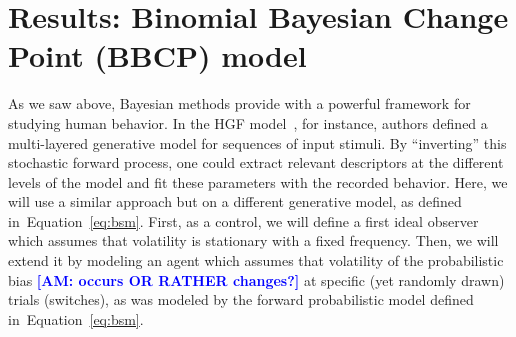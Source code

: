 \documentclass[12pt,english]{article}%
\newcommand{\citep}[1]{\parencite{#1}}
\newcommand{\seeEq}[1]{Equation~\ref{eq:#1}}
\newcommand{\AM}[1]{\textbf{\textcolor{blue}{[AM: #1]}}}
\begin{document}
\section{Results: Binomial Bayesian Change Point (BBCP) model}
\label{sec:bayesian_change_point}
%
%
As we saw above, Bayesian methods provide with
a powerful framework for studying human behavior.
In the HGF model~\citep{Mathys11}, for instance,
authors defined a multi-layered generative model for
sequences of input stimuli.
By ``inverting'' this stochastic forward process,
one could extract relevant descriptors at the different levels of the model
and fit these parameters with the recorded behavior.
Here, we will use a similar approach but on a different generative model,
as defined in~\seeEq{bsm}.
First, as a control, we will define a first ideal observer
which assumes that volatility is stationary with a fixed frequency.
Then, we will extend it by modeling an agent 
which assumes that volatility  of the probabilistic bias \AM{occurs OR RATHER changes?} 
at specific (yet randomly drawn) trials (switches),
as was modeled by the forward probabilistic model defined in~\seeEq{bsm}.
%
\end{document}
